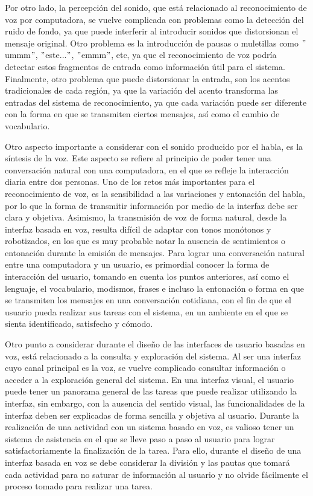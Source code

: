 Por otro lado, la percepción del sonido, que está relacionado al reconocimiento de voz por computadora, se vuelve complicada con problemas como la detección del ruido de fondo, ya que puede interferir al introducir sonidos que distorsionan el mensaje original. Otro problema es la introducción de pausas o muletillas como $"$ummm$"$, $"$este...$"$, $"$emmm$"$, etc, ya que el reconocimiento de voz podría detectar estos fragmentos de entrada como información útil para el sistema. Finalmente, otro problema que puede distorsionar la entrada, son los acentos tradicionales de cada región, ya que la variación del acento transforma las entradas del sistema de reconocimiento, ya que cada variación puede ser diferente con la forma en que se transmiten ciertos mensajes, así como el cambio de vocabulario.

Otro aspecto importante a considerar con el sonido producido por el habla, es la síntesis de la voz. Este aspecto se refiere al principio de poder tener una conversación natural con una computadora, en el que se refleje la interacción diaria entre dos personas. Uno de los retos más importantes para el reconocimiento de voz, es la sensibilidad a las variaciones y entonación del habla, por lo que la forma de transmitir información por medio de la interfaz debe ser clara y objetiva. Asimismo, la transmisión de voz de forma natural, desde la interfaz basada en voz, resulta difícil de adaptar con tonos monótonos y robotizados, en los que es muy probable notar la ausencia de sentimientos o entonación durante la emisión de mensajes. Para lograr una conversación natural entre una computadora y un usuario, es primordial conocer la forma de interacción del usuario, tomando en cuenta los puntos anteriores, así como el lenguaje, el vocabulario, modismos, frases e incluso la entonación o forma en que se transmiten los mensajes en una conversación cotidiana, con el fin de que el usuario pueda realizar sus tareas con el sistema, en un ambiente en el que se sienta identificado, satisfecho y cómodo.

Otro punto a considerar durante el diseño de las interfaces de usuario basadas en voz, está relacionado a la consulta y exploración del sistema. Al ser una interfaz cuyo canal principal es la voz, se vuelve complicado consultar información o acceder a la exploración general del sistema. En una interfaz visual, el usuario puede tener un panorama general de las tareas que puede realizar utilizando la interfaz, sin embargo, con la ausencia del sentido visual, las funcionalidades de la interfaz deben ser explicadas de forma sencilla y objetiva al usuario. Durante la realización de una actividad con un sistema basado en voz, es valioso tener un sistema de asistencia en el que se lleve paso a paso al usuario para lograr satisfactoriamente la finalización de la tarea. Para ello, durante el diseño de una interfaz basada en voz se debe considerar la división y las pautas que tomará cada actividad para no saturar de información al usuario y no olvide fácilmente el proceso tomado para realizar una tarea.


